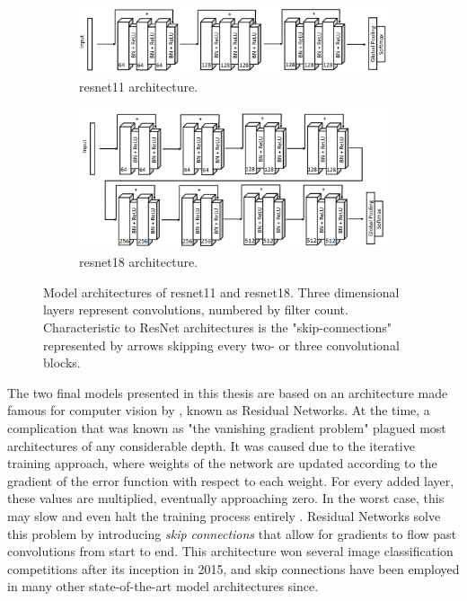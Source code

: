 \begin{figure}[h]
    \begin{subfigure}[b]{\textwidth}
        \includegraphics[width=\textwidth]{figures/impl_ResNet11.png}
        \caption{\acrlong{resnet11} architecture.}
        \label{fig:impl_ResNet11}
    \end{subfigure}
    \begin{subfigure}[b]{\textwidth}
        \includegraphics[width=\textwidth]{figures/impl_ResNet18.png}
        \caption{\acrlong{resnet18} architecture.}
        \label{fig:impl_ResNet18}
    \end{subfigure}
    \caption{Model architectures of \acrshort{resnet11} and \acrshort{resnet18}. Three dimensional layers represent convolutions, numbered by filter count. Characteristic to ResNet architectures is the "skip-connections" represented by arrows skipping every two- or three convolutional blocks.}
\end{figure}

The two final models presented in this thesis are based on an architecture made famous for computer vision by \textcite{he2015}, known as Residual Networks. At the time, a complication that was known as "the vanishing gradient problem"  plagued most architectures of any considerable depth. It was caused due to the iterative training approach, where weights of the network are updated according to the gradient of the error function with respect to each weight. For every added layer, these values are multiplied, eventually approaching zero. In the worst case, this may slow and even halt the training process entirely \cite{basodi2020}. Residual Networks solve this problem by introducing \textit{skip connections} that allow for gradients to flow past convolutions from start to end. This architecture won several image classification competitions after its inception in 2015, and skip connections have been employed in many other state-of-the-art model architectures since.

